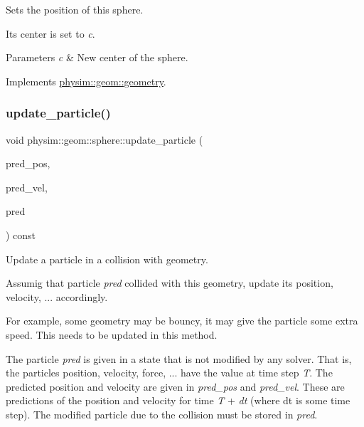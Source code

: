 Sets the position of this sphere. 

Its center is set to {\itshape c}. 
\begin{DoxyParams}{Parameters}
{\em c} & New center of the sphere. \\
\hline
\end{DoxyParams}


Implements \hyperlink{classphysim_1_1geom_1_1geometry_adbd7c270a0b49c2c6d085457a20bfa69}{physim\+::geom\+::geometry}.

\mbox{\label{classphysim_1_1geom_1_1sphere_ae0cfe015fd89080d614c77c0d9042b04}} 
\subsubsection{\texorpdfstring{update\+\_\+particle()}{update\_particle()}}
{\footnotesize\ttfamily void physim\+::geom\+::sphere\+::update\+\_\+particle (\begin{DoxyParamCaption}\item[{const \hyperlink{structphysim_1_1math_1_1vec3}{math\+::vec3} \&}]{pred\+\_\+pos,  }\item[{const \hyperlink{structphysim_1_1math_1_1vec3}{math\+::vec3} \&}]{pred\+\_\+vel,  }\item[{\hyperlink{classphysim_1_1particles_1_1free__particle}{particles\+::free\+\_\+particle} $\ast$}]{pred }\end{DoxyParamCaption}) const\hspace{0.3cm}{\ttfamily [virtual]}}



Update a particle in a collision with geometry. 

Assumig that particle {\itshape pred} collided with this geometry, update its position, velocity, ... accordingly.

For example, some geometry may be \textquotesingle{}bouncy\textquotesingle{}, it may give the particle some extra speed. This needs to be updated in this method.

The particle {\itshape pred} is given in a state that is not modified by any solver. That is, the particle\textquotesingle{}s position, velocity, force, ... have the value at time step {\itshape T}. The predicted position and velocity are given in {\itshape pred\+\_\+pos} and {\itshape pred\+\_\+vel}. These are predictions of the position and velocity for time {\itshape T} + {\itshape dt} (where dt is some time step). The modified particle due to the collision must be stored in {\itshape pred}.

